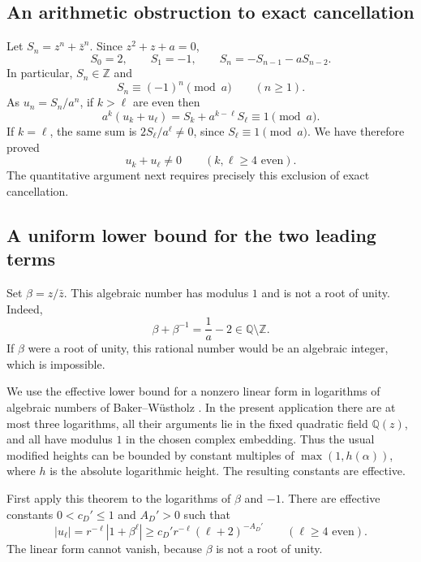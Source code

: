 \documentclass[11pt]{article}
\begin{document}
\subsection{An arithmetic obstruction to exact cancellation}

Let $S_n=z^n+\bar z^n$.  Since $z^2+z+a=0$,
\[
 S_0=2,\qquad S_1=-1,\qquad
 S_n=-S_{n-1}-aS_{n-2}.
\]
In particular, $S_n\in\mathbb Z$ and
\begin{equation}
\label{eq:fr-trace-congruence}
 S_n\equiv(-1)^n\pmod a\qquad(n\geq1).
\end{equation}
As $u_n=S_n/a^n$, if $k>\ell$ are even then
\[
 a^k(u_k+u_\ell)=S_k+a^{k-\ell}S_\ell\equiv1\pmod a.
\]
If $k=\ell$, the same sum is $2S_\ell/a^\ell\ne0$, since
$S_\ell\equiv1\pmod a$.  We have therefore proved
\begin{equation}
\label{eq:fr-main-nonzero}
 u_k+u_\ell\ne0\qquad(k,\ell\geq4\text{ even}).
\end{equation}
The quantitative argument next requires precisely this exclusion of exact
cancellation.

\subsection{A uniform lower bound for the two leading terms}

Set $\beta=z/\bar z$.  This algebraic number has modulus $1$ and is not
a root of unity.  Indeed,
\[
 \beta+\beta^{-1}=\frac1a-2\in\mathbb Q\setminus\mathbb Z.
\]
If $\beta$ were a root of unity, this rational number would be an
algebraic integer, which is impossible.

We use the effective lower bound for a nonzero linear form in logarithms
of algebraic numbers of Baker--W\"ustholz \cite{BW}.  In the present application
there are at most three logarithms, all their arguments lie in the fixed
quadratic field $\mathbb Q(z)$, and all have modulus $1$ in the chosen
complex embedding.  Thus the usual modified heights can be bounded by
constant multiples of $\max(1,h(\alpha))$, where $h$ is the absolute
logarithmic height.  The resulting constants are effective.

First apply this theorem to the logarithms of $\beta$ and $-1$.
There are effective constants $0<c_D'\leq1$ and $A_D'>0$ such that
\begin{equation}
\label{eq:fr-one-trace}
 |u_\ell|=r^{-\ell}|1+\beta^\ell|
 \geq c_D'r^{-\ell}(\ell+2)^{-A_D'}
 \qquad(\ell\geq4\text{ even}).
\end{equation}
The linear form cannot vanish, because $\beta$ is not a root of unity.
\end{document}
